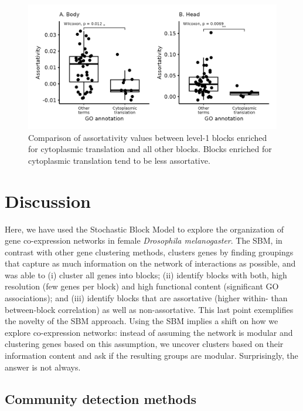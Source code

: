 \documentclass[
]{article}
\begin{document}
\begin{figure}
\centering
\includegraphics{figures/assortativity_cytoplasmic_translation.png}
\caption{Comparison of assortativity values between level-1 blocks
enriched for cytoplasmic translation and all other blocks. Blocks
enriched for cytoplasmic translation tend to be less
assortative.}\label{fig:assort_translation}
\end{figure}

\section{Discussion}\label{discussion}

Here, we have used the Stochastic Block Model to explore the
organization of gene co-expression networks in female \emph{Drosophila
melanogaster}. The SBM, in contrast with other gene clustering methods,
clusters genes by finding groupings that capture as much information on
the network of interactions as possible, and was able to (i) cluster all
genes into blocks; (ii) identify blocks with both, high resolution (few
genes per block) and high functional content (significant GO
associations); and (iii) identify blocks that are assortative (higher
within- than between-block correlation) as well as non-assortative. This
last point exemplifies the novelty of the SBM approach. Using the SBM
implies a shift on how we explore co-expression networks: instead of
assuming the network is modular and clustering genes based on this
assumption, we uncover clusters based on their information content and
ask if the resulting groups are modular. Surprisingly, the answer is not
always.

\subsection{Community detection
methods}\label{community-detection-methods}
\end{document}
